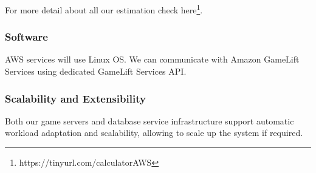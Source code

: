 For more detail about all our estimation check here\footnote{https://tinyurl.com/calculatorAWS }.
\subsubsection{Software}
AWS services will use Linux OS. We can communicate with Amazon GameLift Services using dedicated GameLift Services API.
\subsubsection{Scalability and Extensibility}
Both our game servers and database service infrastructure support automatic workload adaptation and scalability, allowing to scale up the system if required.